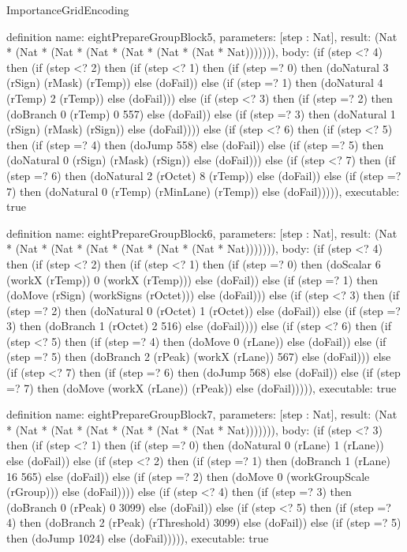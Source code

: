 \begin{lexlean}{ImportanceGridEncoding}
\begin{semanticmodule}
definition{
  name: eightPrepareGroupBlock5,
  parameters: [step : Nat],
  result: (Nat * (Nat * (Nat * (Nat * (Nat * (Nat * (Nat * Nat))))))),
  body: (if (step <? 4) then
      (if (step <? 2) then
      (if (step <? 1) then
      (if (step =? 0) then (doNatural 3 (rSign) (rMask) (rTemp)) else (doFail)) else
      (if (step =? 1) then (doNatural 4 (rTemp) 2 (rTemp)) else (doFail))) else
      (if (step <? 3) then
      (if (step =? 2) then (doBranch 0 (rTemp) 0 557) else (doFail)) else
      (if (step =? 3) then (doNatural 1 (rSign) (rMask) (rSign)) else (doFail)))) else
      (if (step <? 6) then
      (if (step <? 5) then
      (if (step =? 4) then (doJump 558) else (doFail)) else
      (if (step =? 5) then (doNatural 0 (rSign) (rMask) (rSign)) else (doFail))) else
      (if (step <? 7) then
      (if (step =? 6) then (doNatural 2 (rOctet) 8 (rTemp)) else (doFail)) else
      (if (step =? 7) then (doNatural 0 (rTemp) (rMinLane) (rTemp)) else (doFail))))),
  executable: true
}

definition{
  name: eightPrepareGroupBlock6,
  parameters: [step : Nat],
  result: (Nat * (Nat * (Nat * (Nat * (Nat * (Nat * (Nat * Nat))))))),
  body: (if (step <? 4) then
      (if (step <? 2) then
      (if (step <? 1) then
      (if (step =? 0) then (doScalar 6 (workX (rTemp)) 0 (workX (rTemp))) else (doFail)) else
      (if (step =? 1) then (doMove (rSign) (workSigns (rOctet))) else (doFail))) else
      (if (step <? 3) then
      (if (step =? 2) then (doNatural 0 (rOctet) 1 (rOctet)) else (doFail)) else
      (if (step =? 3) then (doBranch 1 (rOctet) 2 516) else (doFail)))) else
      (if (step <? 6) then
      (if (step <? 5) then
      (if (step =? 4) then (doMove 0 (rLane)) else (doFail)) else
      (if (step =? 5) then (doBranch 2 (rPeak) (workX (rLane)) 567) else (doFail))) else
      (if (step <? 7) then
      (if (step =? 6) then (doJump 568) else (doFail)) else
      (if (step =? 7) then (doMove (workX (rLane)) (rPeak)) else (doFail))))),
  executable: true
}

definition{
  name: eightPrepareGroupBlock7,
  parameters: [step : Nat],
  result: (Nat * (Nat * (Nat * (Nat * (Nat * (Nat * (Nat * Nat))))))),
  body: (if (step <? 3) then
      (if (step <? 1) then
      (if (step =? 0) then (doNatural 0 (rLane) 1 (rLane)) else (doFail)) else
      (if (step <? 2) then
      (if (step =? 1) then (doBranch 1 (rLane) 16 565) else (doFail)) else
      (if (step =? 2) then (doMove 0 (workGroupScale (rGroup))) else (doFail)))) else
      (if (step <? 4) then
      (if (step =? 3) then (doBranch 0 (rPeak) 0 3099) else (doFail)) else
      (if (step <? 5) then
      (if (step =? 4) then (doBranch 2 (rPeak) (rThreshold) 3099) else (doFail)) else
      (if (step =? 5) then (doJump 1024) else (doFail))))),
  executable: true
}


\end{semanticmodule}
\end{lexlean}
